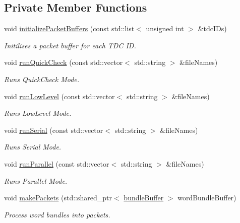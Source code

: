 \subsection*{Private Member Functions}
\begin{DoxyCompactItemize}
\item 
void \hyperlink{class_processor_aa9ad1e9d6f3d217e23649e42cd07de90}{initialize\+Packet\+Buffers} (const std\+::list$<$ unsigned int $>$ \&tdc\+I\+Ds)
\begin{DoxyCompactList}\small\item\em Initilises a packet buffer for each T\+DC ID. \end{DoxyCompactList}\item 
void \hyperlink{class_processor_ae045ebe853cd1f2124ecb93b829a9113}{run\+Quick\+Check} (const std\+::vector$<$ std\+::string $>$ \&file\+Names)
\begin{DoxyCompactList}\small\item\em Runs Quick\+Check Mode. \end{DoxyCompactList}\item 
void \hyperlink{class_processor_ae697c1dd3136d1cf973d0ecc5a65a53a}{run\+Low\+Level} (const std\+::vector$<$ std\+::string $>$ \&file\+Names)
\begin{DoxyCompactList}\small\item\em Runs Low\+Level Mode. \end{DoxyCompactList}\item 
void \hyperlink{class_processor_a7475d40a755f8afa7b6746c7949454d9}{run\+Serial} (const std\+::vector$<$ std\+::string $>$ \&file\+Names)
\begin{DoxyCompactList}\small\item\em Runs Serial Mode. \end{DoxyCompactList}\item 
void \hyperlink{class_processor_a1e5a47f8539e3568e2ba8f14f1fddea2}{run\+Parallel} (const std\+::vector$<$ std\+::string $>$ \&file\+Names)
\begin{DoxyCompactList}\small\item\em Runs Parallel Mode. \end{DoxyCompactList}\item 
void \hyperlink{class_processor_a554de487c5e8205872151fbedb315291}{make\+Packets} (std\+::shared\+\_\+ptr$<$ \hyperlink{class_processor_a531b4c5f7c0d810fc6e9e1dd3d115725}{bundle\+Buffer} $>$ word\+Bundle\+Buffer)
\begin{DoxyCompactList}\small\item\em Process word bundles into packets. \end{DoxyCompactList}\item 

\end{DoxyCompactItemize}
